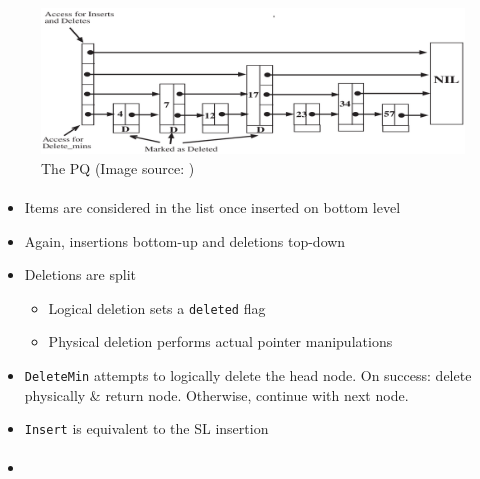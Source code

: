 \documentclass[usenames,dvipsnames]{beamer}
\begin{document}
\begin{frame}{}
\framesubtitle{\citeauthor{shavit2000skiplist}}

\begin{figure}
\includegraphics[width=\textwidth]{shavit_lotan}
\caption{The \citeauthor{shavit2000skiplist} \ac{PQ} (Image source: \cite{shavit2000skiplist})}
\end{figure}
\end{frame}

\begin{frame}{}
\framesubtitle{\citeauthor{shavit2000skiplist}}

\begin{itemize}
\item Items are considered in the list once inserted on bottom level
\item Again, insertions bottom-up and deletions top-down
\item Deletions are split
    \begin{itemize}
    \item Logical deletion sets a \lstinline|deleted| flag
    \item Physical deletion performs actual pointer manipulations
    \end{itemize}
\item \lstinline|DeleteMin| attempts to logically delete the head node.
     On success: delete physically \& return node. Otherwise, continue with
     next node.
\item \lstinline|Insert| is equivalent to the \ac{SL} insertion
\end{itemize}
\end{frame}

\begin{frame}{}
\framesubtitle{\citeauthor{shavit2000skiplist}}

\begin{itemize}
\item 
\end{itemize}
\end{frame}
\end{document}
